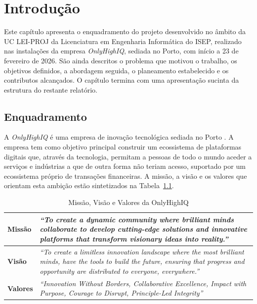 \chapter{Introdução}
\label{cap:introdução}

Este capítulo apresenta o enquadramento do projeto desenvolvido no âmbito da \gls{UC} \gls{LEI-PROJ} da Licenciatura em Engenharia Informática do \gls{ISEP}, realizado nas instalações da empresa \textit{OnlyHighIQ}, sediada no Porto, com início a 23 de fevereiro de 2026. São ainda descritos o problema que motivou o trabalho, os objetivos definidos, a abordagem seguida, o planeamento estabelecido e os contributos alcançados. O capítulo termina com uma apresentação sucinta da estrutura do restante relatório.


\section{Enquadramento}
\label{sec:enquadramento}

A \textit{OnlyHighIQ} é uma empresa de inovação tecnológica sediada no Porto \cite{OYI}. A empresa tem como objetivo principal construir um ecossistema de plataformas digitais que, através da tecnologia, permitam a pessoas de todo o mundo aceder a serviços e indústrias a que de outra forma não teriam acesso, suportado por um ecossistema próprio de transações financeiras. A missão, a visão e os valores que orientam esta ambição estão sintetizados na Tabela~\ref{tab:missao_visao_valores}.

\begin{table}[H]
\caption{Missão, Visão e Valores da OnlyHighIQ}
\label{tab:missao_visao_valores}
\begin{center}
\begin{tabular}{|l|p{10cm}|}
\hline
\textbf{Missão} & \textit{``To create a dynamic community where brilliant minds collaborate to develop cutting-edge solutions and innovative platforms that transform visionary ideas into reality.''} \\ \hline
\textbf{Visão} & \textit{``To create a limitless innovation landscape where the most brilliant minds, have the tools to build the future, ensuring that progress and opportunity are distributed to everyone, everywhere.''} \\ \hline
\textbf{Valores} & \textit{``Innovation Without Borders, Collaborative Excellence, Impact with Purpose, Courage to Disrupt, Principle-Led Integrity''} \\ \hline
\end{tabular}
\end{center}
\end{table}

